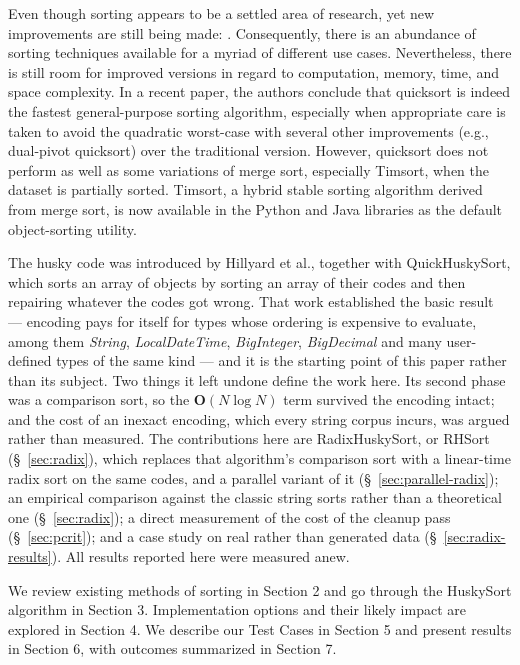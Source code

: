 \documentclass[twoside,leqno,twocolumn]{article}
\begin{document}
Even though sorting appears to be a settled area of research, yet new improvements are still being made:
\cite{Dual-pivot,Timsort,doi:10.1137/1.9781611975994.101,10.5555/313559.313859,10.1002/spe.4380231105}.
Consequently, there is an abundance of sorting techniques available for a myriad of different use cases.
Nevertheless, there is still room for improved versions in regard to computation, memory, time, and space complexity.
In a recent paper\cite{sort}, the authors conclude that quicksort is indeed the fastest general-purpose sorting algorithm, especially when appropriate care is taken to avoid the quadratic worst-case with several other improvements (e.g., dual-pivot quicksort)\cite{Dual-pivot} over the traditional version\cite{10.1145/366622.366644}.
However, quicksort does not perform as well as some variations of merge sort, especially Timsort\cite{Timsort}, when the dataset is partially sorted.
Timsort, a hybrid stable sorting algorithm derived from merge sort, is now available in the Python and Java libraries as the default object-sorting utility.

The husky code was introduced by Hillyard et al.\cite{huskysort2020}, together with QuickHuskySort,
which sorts an array of objects by sorting an array of their codes and then repairing whatever the codes
got wrong.
That work established the basic result --- encoding pays for itself for types whose ordering is expensive
to evaluate, among them \emph{String}, \emph{LocalDateTime}, \emph{BigInteger}, \emph{BigDecimal} and many
user-defined types of the same kind --- and it is the starting point of this paper rather than its
subject.
Two things it left undone define the work here.
Its second phase was a comparison sort, so the $\textbf{O}(N \log N)$ term survived the encoding intact;
and the cost of an inexact encoding, which every string corpus incurs, was argued rather than measured.
The contributions here are RadixHuskySort, or RHSort (\S~\ref{sec:radix}),
which replaces that algorithm's comparison sort with a linear-time radix sort on the same codes,
and a parallel variant of it (\S~\ref{sec:parallel-radix});
an empirical comparison against the classic string sorts rather than a theoretical one (\S~\ref{sec:radix});
a direct measurement of the cost of the cleanup pass (\S~\ref{sec:pcrit});
and a case study on real rather than generated data (\S~\ref{sec:radix-results}).
All results reported here were measured anew.

We review existing methods of sorting in Section 2 and go through the HuskySort algorithm in Section 3.
Implementation options and their likely impact are explored in Section 4.
We describe our Test Cases in Section 5 and present results in Section 6, with outcomes summarized in Section 7.
\end{document}
